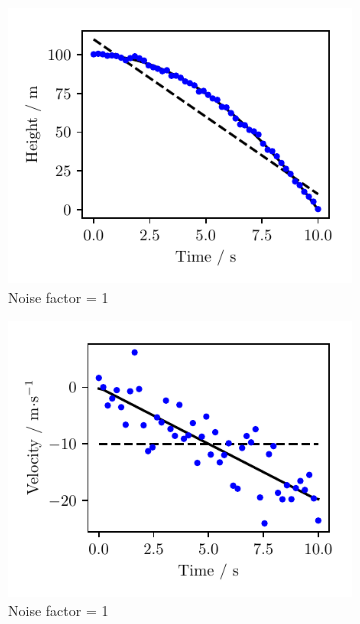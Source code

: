 \begin{figure}[htbp]
	\begin{subfigure}[b]{0.5\textwidth}
		\centering
    \includegraphics{Figures/noise_001_model.pdf}
		\caption{Noise factor = \num{1}}\label{fig:1a}
	\end{subfigure}\hfill  
	\begin{subfigure}[b]{0.5\textwidth}
		\centering
    \includegraphics{Figures/noise_001_derivative.pdf}
		\caption{Noise factor = \num{1}}\label{fig:1b}
	\end{subfigure}\hfill
	\begin{subfigure}[b]{0.5\textwidth}
		\centering

\end{subfigure}
\end{figure}
